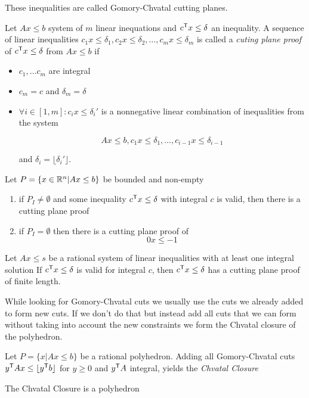These inequalities are called Gomory-Chvatal cutting planes.

\begin{Def} Let $Ax\leq b$ system of $m$ linear inequations and ${c}^\text{\upshape \sffamily T}x\leq \delta$ an inequality. A sequence of linear inequalities $c_1x\leq \delta_1, c_2x\leq \delta_2,\ldots, c_mx\leq \delta_m$ is called a \emph{cuting plane proof} of ${c}^\text{\upshape \sffamily T} x\leq \delta$ from $Ax\leq b$ if
\begin{itemize}
\item $c_1,\ldots c_m$ are integral
\item $c_m=c$ and $\delta_m=\delta$
\item $\forall i\in [1,m]: c_ix\leq \delta_i'$ is a nonnegative linear combination of inequalities from the system

\[Ax\leq b, c_1x\leq \delta_1,\ldots,c_{i-1}x\leq \delta_{i-1}\]

and $\delta_i=\lfloor \delta_i'\rfloor$.
\end{itemize}
\end{Def}

\begin{thm}[Existence] Let $P=\{x\in \mathbb{R}^n | Ax\leq b\}$ be bounded and non-empty

\begin{enumerate}
\item if $P_I\neq \emptyset$ and some inequality ${c}^\text{\upshape \sffamily T} x\leq \delta$ with integral $c$ is valid, then there is a cutting plane proof
\item if $P_I=\emptyset$ then there is a cutting plane proof of 
\[0x\leq -1\]
\end{enumerate}
\end{thm}

\begin{thm} Let $Ax\leq s$ be a rational system of linear inequalities with at least one integral solution If ${c}^\text{\upshape \sffamily T}x\leq \delta$ is valid for integral $c$, then ${c}^\text{\upshape \sffamily T}x\leq \delta$ has a cutting plane proof of finite length.
\end{thm}

While looking for Gomory-Chvatal cuts we usually use the cuts we already added to form new cuts. If we don't do that but instead add all cuts that we can form without taking into account the new constraints we form the Chvatal closure of the polyhedron.

\begin{Def} Let $P=\{x|Ax\leq b\}$ be a rational polyhedron. Adding all Gomory-Chvatal cuts ${y}^\text{\upshape \sffamily T}Ax\leq \lfloor {y}^\text{\upshape \sffamily T} b\rfloor$ for $y\geq 0$ and ${y}^\text{\upshape \sffamily T} A$ integral, yields the \emph{Chvatal Closure}
\end{Def}

\begin{thm} The Chvatal Closure is a polyhedron\end{thm}